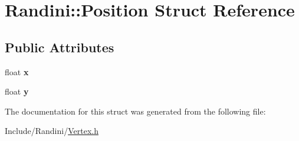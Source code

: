 \hypertarget{structRandini_1_1Position}{
\section{Randini::Position Struct Reference}
\label{structRandini_1_1Position}
}
\subsection*{Public Attributes}
\begin{DoxyCompactItemize}
\item 
\hypertarget{structRandini_1_1Position_ac88100693d62debc1d76df43812bf943}{
float {\bfseries x}}
\label{structRandini_1_1Position_ac88100693d62debc1d76df43812bf943}

\item 
\hypertarget{structRandini_1_1Position_a54e54714d9d88bf787e76836cc60b6e1}{
float {\bfseries y}}
\label{structRandini_1_1Position_a54e54714d9d88bf787e76836cc60b6e1}

\end{DoxyCompactItemize}


The documentation for this struct was generated from the following file:\begin{DoxyCompactItemize}
\item 
Include/Randini/\hyperlink{Vertex_8h}{Vertex.h}\end{DoxyCompactItemize}

